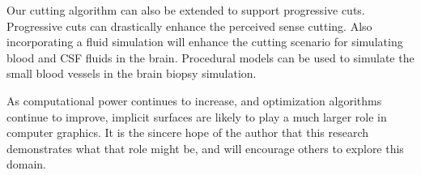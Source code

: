 Our cutting algorithm can also be extended to support progressive cuts. Progressive cuts can drastically enhance the perceived sense cutting. 
Also incorporating a fluid simulation will enhance the cutting scenario for simulating blood and CSF fluids in the brain.
Procedural models can be used to simulate the small blood vessels in the brain biopsy simulation. 

As computational power continues to increase, and optimization algorithms continue to improve, implicit surfaces are likely to play a much larger 
role in computer graphics. It is the sincere hope of the author that this research demonstrates what that role might be, and will encourage others
to explore this domain.
